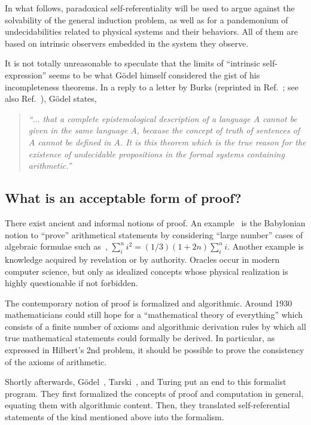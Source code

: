 \documentclass[rmp,amsfonts,showpacs,showkeys,twocolumn]{revtex4}
\begin{document}
In what follows, paradoxical self-referentiality will be used to argue
against the solvability of the general induction problem,
as well as for a pandemonium of undecidabilities related to physical systems
and their behaviors. All of them are based on intrinsic observers embedded
in the system they observe.

It is not totally unreasonable to speculate that the
limits of ``intrinsic self-expression'' seems to be
what G\"odel himself
considered the gist of his incompleteness theorems.
In a reply to a letter by Burks
(reprinted in Ref.~\cite[p. 55]{v-neumann-66}; see also Ref.~\cite[p.554]{fef-84}),
G\"odel states,
 \begin{quote}
 {\em
 ``$\ldots$ that a complete epistemological description
 of a language $A$ cannot be given in the same language $A$, because
 the concept of truth of sentences of $A$ cannot be defined in $A$. It
 is this theorem which is the true reason for the existence of
 undecidable propositions in the formal systems containing arithmetic.''}
 \end{quote}







\subsection{What is an acceptable form of proof?}

There exist ancient and informal notions of proof.
An example~\cite{baats1} is the Babylonian notion to ``prove'' arithmetical statements
by considering ``large number'' cases
of algebraic formulae such as~\cite[Chapter V]{neugeb},
$\sum_i^n i^2 = (1/3)(1+2n)\sum_i^n i$.
Another example  is knowledge acquired by revelation or by authority.
Oracles occur in modern computer science,
but only as idealized concepts whose physical realization is highly
questionable if not forbidden.

The contemporary notion of proof is formalized and algorithmic.
Around 1930 mathematicians could still hope for a
``mathematical theory of everything''
which consists of a finite number of axioms and algorithmic derivation rules
by which all true mathematical statements could formally be derived.
In particular, as expressed in Hilbert's 2nd problem,
it should be possible to prove the consistency of the axioms of arithmetic.

Shortly afterwards, G\"odel~\cite{godel1}, Tarski~\cite{tarski:32}, and Turing
\cite{turing-36} put an end to this formalist program.
They first formalized the concepts of proof and computation in general,
equating them with algorithmic content.
Then, they translated self-referential statements of the
kind mentioned above into the formalism.
\end{document}
